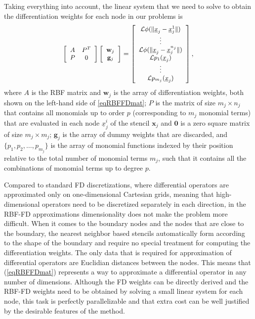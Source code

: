 \documentclass{UUThesisTemplate}
\begin{document}
\par
Taking everything into account, the linear system that we need to solve to obtain the differentiation weights for each node in our problems is
\begin{equation}
{\footnotesize{
\label{eq:D2}
\left[\begin{array}{cc}
A & P^T \\
P & 0 \\
\end{array}\right]
\left[\begin{array}{c}
{\mathbf{w}}_j\\
{\mathbf{g}}_j\\
\end{array}\right]=
\left[\begin{array}{c}
\mathcal{L}\phi(\|\underline{x}_{j}-\underline{x}_j^{1}\|)\\
\vdots \\
\mathcal{L}\phi(\|\underline{x}_{j}-\underline{x}_j^{n_j}\|)\\
\mathcal{L}p_1(\underline{x}_j)\\
\vdots\\
\mathcal{L}p_{m_j}(\underline{x}_j)
\end{array}\right],
}}
\end{equation}
where $A$ is the RBF matrix and $\mathbf{w}_j$ is the array of differentiation weights, both shown on the left-hand side of \eqref{eqRBFFDmat}; $P$ is the matrix of size $m_j \times n_j$ that contains all monomials up to order $p$ (corresponding to $m_j$ monomial terms) that are evaluated in each node $\underline{x}_j^i$ of the stencil $\mathbf{x}_j$ and $\mathbf{0}$ is a zero square matrix of size $m_j \times m_j$; $\mathbf{g}_j$ is the array of dummy weights that are discarded, and $\{p_1, p_2, \ldots, p_{m_j}\}$ is the array of monomial functions indexed by their position relative to the total number of monomial terms $m_j$, such that it contains all the combinations of monomial terms up to degree $p$.
\par
Compared to standard FD discretizations, where differential operators are approximated only on one-dimensional Cartesian grids, meaning that high-dimensional operators need to be discretized separately in each direction, in the RBF-FD approximations dimensionality does not make the problem more difficult. When it comes to the boundary nodes and the nodes that are close to the boundary, the nearest neighbor based stencils automatically form according to the shape of the boundary and require no special treatment for computing the differentiation weights. The only data that is required for approximation of differential operators are Euclidian distances between the nodes. This means that (\ref{eqRBFFDmat}) represents a way to approximate a differential operator in any number of dimensions. Although the FD weights can be directly derived and the RBF-FD weights need to be obtained by solving a small linear system for each node, this task is perfectly parallelizable and that extra cost can be well justified by the desirable features of the method.
\end{document}
